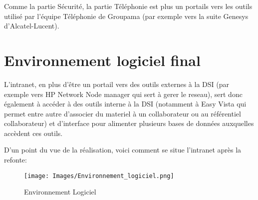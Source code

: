 Comme la partie Sécurité, la partie Téléphonie est plus un portails
vers les outils utilisé par l'équipe Téléphonie de Groupama (par
exemple vers la suite Genesys d'Alcatel-Lucent).




\section{Environnement logiciel final}

L'intranet, en plus d'être un portail vers des outils externes à la
DSI (par exemple vers HP Network Node manager qui sert à gerer le
reseau), sert donc également à accéder à des outils interne à la DSI
(notamment à Easy Vista qui permet entre autre d'associer du materiel
à un collaborateur ou au référentiel collaborateur) et d'interface
pour alimenter plusieurs bases de données auxquelles accèdent ces
outils.

D'un point du vue de la réalisation, voici comment se situe l'intranet après la refonte:

\begin{figure}[h!]
\begin{center}
\texttt{[image: Images/Environnement\_logiciel.png]}
\caption{Environnement Logiciel}
\label{Environnement Logiciel}
\end{center}
\end{figure}
 
